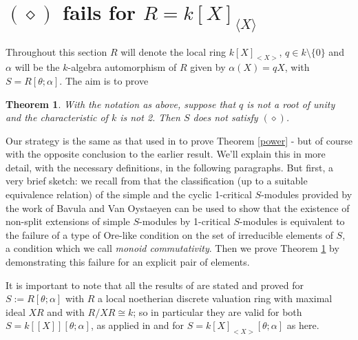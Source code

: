 \documentclass[a4paper, 11pt]{article}
\newtheorem{theorem}{Theorem}[section]
\theoremstyle{definition}
\begin{document}
\bigskip

\section{$(\diamond)$ fails for $R = k[X]_{\langle X \rangle}$}\label{fail}


Throughout this section $R$ will denote the local ring $k[X]_{<X>}$, $q \in k \setminus \{0\}$ and $\alpha$ will be the $k$-algebra automorphism of $R$ given by $\alpha (X) = qX$, with $S = R[\theta; \alpha]$. The aim is to prove 

\begin{theorem}\label{k[X]thm} With the notation as above, suppose that $q$ is not a root of unity and the characteristic of $k$ is not 2. Then $S$ does not satisfy  $(\diamond)$. 
\end{theorem}

\medskip

Our strategy is the same as that used in \cite{BCM2} to prove Theorem \ref{power} - but of course with the opposite conclusion to the earlier result. We'll explain this in more detail, with the necessary definitions, in the following paragraphs. But first, a very brief sketch: we recall from \cite{BCM2} that the classification (up to a suitable equivalence relation) of the simple and the cyclic 1-critical $S$-modules provided by the work of Bavula and Van Oystaeyen \cite{BVO} can be used to show that the existence of non-split extensions of simple $S$-modules by 1-critical $S$-modules is equivalent to the failure of a type of Ore-like condition on the set of irreducible elements of $S$, a condition which we call {\it monoid commutativity}. Then we prove Theorem \ref{k[X]thm} by demonstrating this failure for an explicit pair of elements. 

\medskip

It is important to note that all the results of \cite[$\S\S$5, 6.1, 6.2]{BCM2} are stated and proved for $S := R[\theta;\alpha]$ with $R$ a local noetherian discrete valuation ring with maximal ideal $XR$ and with $R/XR \cong k$; so in particular they are valid for both $S= k[[X]][\theta; \alpha]$, as applied in \cite[$\S$6.3]{BCM2} and for $S = k[X]_{<X>}[\theta; \alpha]$ as here.

\medskip
\end{document}
